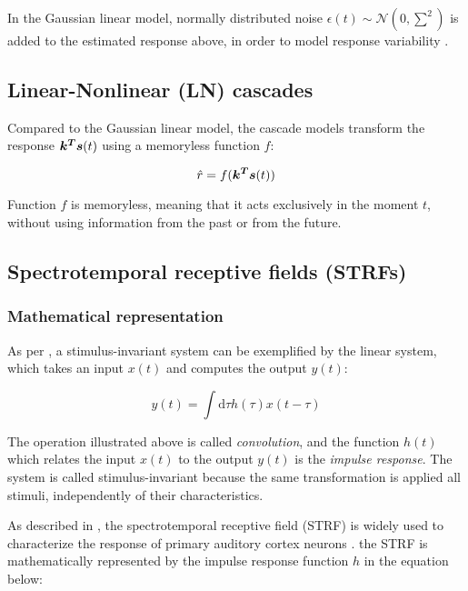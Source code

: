 In the Gaussian linear model, normally distributed noise $\epsilon(t) \sim \mathcal{N}(0, \sum^2)$ is added to the estimated response above, in order to model response variability \parencite{meyerModelsNeuronalStimulusResponse2017}.

\subsection{Linear-Nonlinear (LN) cascades}

Compared to the Gaussian linear model, the cascade models transform the response $\bm{k^T}\bm{s}(t)$ using a memoryless function $f$:

\begin{equation}
	\hat{r} = f(\bm{k^T}\bm{s}(t))
\end{equation}

Function $f$ is memoryless, meaning that it acts exclusively in the moment $t$, without using information from the past or from the future.

\subsection{Spectrotemporal receptive fields (STRFs)}

\subsubsection{Mathematical representation}

As per \textcite{aertsenSpectroTemporalReceptiveField1981}, a stimulus-invariant system can be exemplified by the linear system, which takes an input $x(t)$ and computes the output $y(t)$:

\begin{equation*}
	y(t) = \int \mathrm{d}\tau h(\tau) x(t - \tau)
\end{equation*}

The operation illustrated above is called \emph{convolution}, and the function $h(t)$ which relates the input $x(t)$ to the output $y(t)$ is the \emph{impulse response}. The system is called stimulus-invariant because the same transformation is applied all stimuli, independently of their characteristics.

As described in \textcite{aertsenSpectrotemporalReceptiveFields1980}, the spectrotemporal receptive field (STRF) is widely used to characterize the response of primary auditory cortex neurons \parencite{ahrensNonlinearitiesContextualInfluences2008}. the STRF is mathematically represented by the impulse response function $h$ in the equation below:

